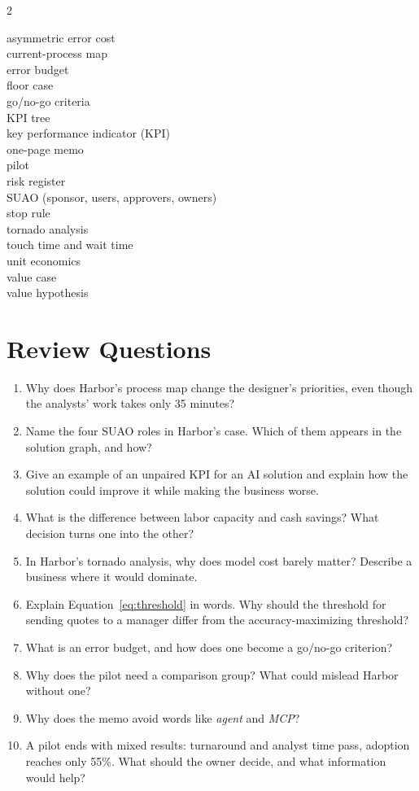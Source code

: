 \begin{multicols}{2}
\raggedright\small
asymmetric error cost \\
current-process map \\
error budget \\
floor case \\
go/no-go criteria \\
KPI tree \\
key performance indicator (KPI) \\
one-page memo \\
pilot \\
risk register \\
SUAO (sponsor, users, approvers, owners) \\
stop rule \\
tornado analysis \\
touch time and wait time \\
unit economics \\
value case \\
value hypothesis
\end{multicols}

\section*{Review Questions}

\begin{enumerate}[itemsep=2pt]
  \item Why does Harbor's process map change the designer's priorities, even though the analysts' work takes only 35 minutes?
  \item Name the four SUAO roles in Harbor's case. Which of them appears in the solution graph, and how?
  \item Give an example of an unpaired KPI for an AI solution and explain how the solution could improve it while making the business worse.
  \item What is the difference between labor capacity and cash savings? What decision turns one into the other?
  \item In Harbor's tornado analysis, why does model cost barely matter? Describe a business where it would dominate.
  \item Explain Equation~\eqref{eq:threshold} in words. Why should the threshold for sending quotes to a manager differ from the accuracy-maximizing threshold?
  \item What is an error budget, and how does one become a go/no-go criterion?
  \item Why does the pilot need a comparison group? What could mislead Harbor without one?
  \item Why does the memo avoid words like \emph{agent} and \emph{MCP}?
  \item A pilot ends with mixed results: turnaround and analyst time pass, adoption reaches only 55\%. What should the owner decide, and what information would help?
\end{enumerate}

